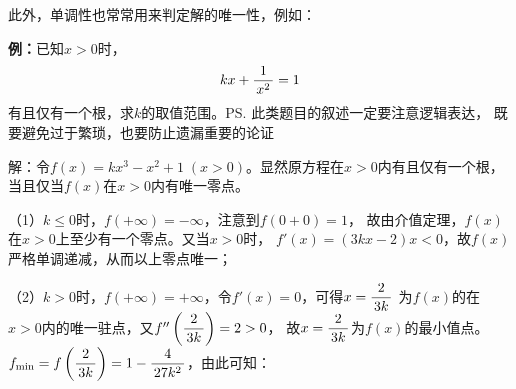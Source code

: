 \begin{center}
	\quad
\end{center}

此外，单调性也常常用来判定解的唯一性，例如：

{\bf 例：}已知$x>0$时，
$$kx+\displaystyle\frac{\,{1}\,}{\,{x^2}\,}=1$$
有且仅有一个根，求$k$的取值范围。\ps{此类题目的叙述一定要注意逻辑表达，
既要避免过于繁琐，也要防止遗漏重要的论证}

解：令$f(x)=kx^3-x^2+1\;(x>0)$。显然原方程在$x>0$内有且仅有一个根，
当且仅当$f(x)$在$x>0$内有唯一零点。

（1）$k\leq 0$时，$f(+\infty)=-\infty$，注意到$f(0+0)=1$，
故由介值定理，$f(x)$在$x>0$上至少有一个零点。又当$x>0$时，
$f'(x)=(3kx-2)x<0$，故$f(x)$严格单调递减，从而以上零点唯一；

（2）$k>0$时，$f(+\infty)=+\infty$，令$f'(x)=0$，可得$x=\displaystyle\frac{\,{2}\,}{\,{3k}\,}$
为$f(x)$的在$x>0$内的唯一驻点，又$f''\left(\displaystyle\frac{\,{2}\,}{\,{3k}\,}\right)=2>0$，
故$x=\displaystyle\frac{\,{2}\,}{\,{3k}\,}$为$f(x)$的最小值点。$f_{\min}=f\left(\displaystyle\frac{\,{2}\,}{\,{3k}\,}\right)=1
-\displaystyle\frac{\,{4}\,}{\,{27k^2}\,}$，由此可知：

